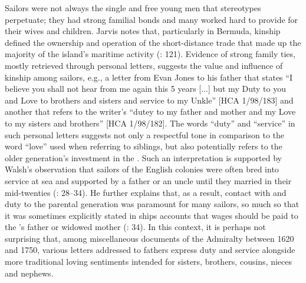   Sailors were not always the single and free young men that stereotypes perpetuate; they had strong familial bonds and many worked hard to provide for their wives and children. Jarvis notes that, particularly in Bermuda, kinship defined the ownership and operation of the short-distance trade that made up the majority of the island’s maritime activity (\citeyear*{Jarvis2010}: 121). Evidence of strong family ties, mostly retrieved through personal letters, suggests the value and influence of kinship among sailors, e.g., a letter from Evan Jones to his father that states “I believe you shall not hear from me again this 5 years [...] but my Duty to you and Love to brothers and sisters and service to my Unkle” [HCA 1/98/183] and another that refers to the writer’s “dutey to my father and mother and my Love to my sisters and brothers” [HCA 1/98/182]. The words “duty” and “service” in such personal letters suggests not only a respectful tone in comparison to the word “love” used when referring to siblings, but also potentially refers to the older generation’s investment in the . Such an interpretation is supported by Walsh’s observation that sailors of the English colonies were often bred into service at sea and supported by a father or an uncle until they married in their mid-twenties (\citeyear*{Walsh1994}: 28–34). He further explains that, as a result, contact with and duty to the parental generation was paramount for many sailors, so much so that it was sometimes explicitly stated in ships accounts that wages should be paid to the ’s father or widowed mother (\citealt{Walsh1994}: 34). In this context, it is perhaps not surprising that, among miscellaneous documents of the Admiralty between 1620 and 1750, various letters addressed to fathers express duty and service alongside more traditional loving sentiments intended for sisters, brothers, cousins, nieces and nephews.  

